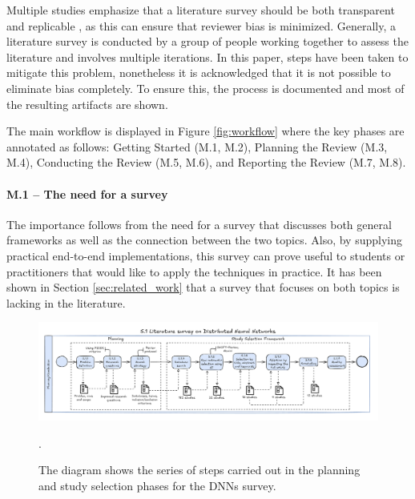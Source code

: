 Multiple studies emphasize that a literature survey should be both transparent and replicable
\cite{keele_systematic_2007, dos_santos_sustainable_2024-1}, as this can ensure that reviewer bias
is minimized. Generally, a literature survey is conducted by a group of people working together to
assess the literature and involves multiple iterations. In this paper, steps have been taken to
mitigate this problem, nonetheless it is acknowledged that it is not possible to eliminate bias
completely. To ensure this, the process is documented and most of the resulting artifacts are
shown.


The main workflow is displayed in Figure \ref{fig:workflow} where the key phases are annotated as
follows: Getting Started (M.1, M.2), Planning the Review (M.3, M.4), Conducting the Review (M.5,
M.6), and Reporting the Review (M.7, M.8).

\paragraph{M.1 -- The need for a survey}
\label{sec:need_for_survey}
The importance follows from the need for a survey that discusses both general frameworks as well as
the connection between the two topics. Also, by supplying practical end-to-end implementations, this
survey can prove useful to students or practitioners that would like to apply the techniques in practice.
It has been shown in Section \ref{sec:related_work} that a survey that focuses on both topics is lacking
in the literature.

\begin{figure}[th]
	\centering
	\includegraphics[width=\linewidth]{figures/survey-dnn.pdf}
	\caption{The diagram shows the series of steps carried out in the planning and study selection
		phases for the DNNs survey.}.
	\label{fig:workflow-study-dnn}
\end{figure}

